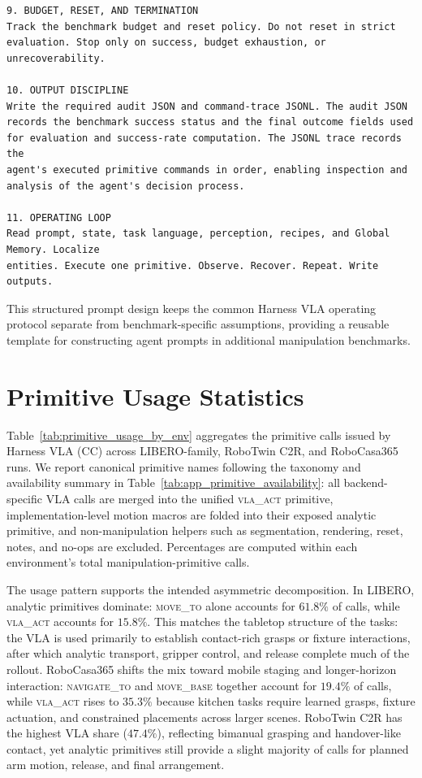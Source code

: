 \documentclass{article}
\begin{document}
\begin{samepage}
\begin{lstlisting}[frame=single,framerule=0.5pt]
9. BUDGET, RESET, AND TERMINATION
Track the benchmark budget and reset policy. Do not reset in strict
evaluation. Stop only on success, budget exhaustion, or unrecoverability.

10. OUTPUT DISCIPLINE
Write the required audit JSON and command-trace JSONL. The audit JSON
records the benchmark success status and the final outcome fields used
for evaluation and success-rate computation. The JSONL trace records the
agent's executed primitive commands in order, enabling inspection and
analysis of the agent's decision process.

11. OPERATING LOOP
Read prompt, state, task language, perception, recipes, and Global Memory. Localize
entities. Execute one primitive. Observe. Recover. Repeat. Write outputs.
\end{lstlisting}
\end{samepage}

This structured prompt design keeps the common Harness VLA operating protocol separate from benchmark-specific assumptions, providing a reusable template for constructing agent prompts in additional manipulation benchmarks.


\section{Primitive Usage Statistics}
\label{app:primitive_stats}

Table~\ref{tab:primitive_usage_by_env} aggregates the primitive calls issued by Harness VLA (CC) across LIBERO-family, RoboTwin C2R, and RoboCasa365 runs. We report canonical primitive names following the taxonomy and availability summary in Table~\ref{tab:app_primitive_availability}: all backend-specific VLA calls are merged into the unified \textsc{vla\_act} primitive, implementation-level motion macros are folded into their exposed analytic primitive, and non-manipulation helpers such as segmentation, rendering, reset, notes, and no-ops are excluded. Percentages are computed within each environment's total manipulation-primitive calls.

The usage pattern supports the intended asymmetric decomposition. In LIBERO, analytic primitives dominate: \textsc{move\_to} alone accounts for $61.8\%$ of calls, while \textsc{vla\_act} accounts for $15.8\%$. This matches the tabletop structure of the tasks: the VLA is used primarily to establish contact-rich grasps or fixture interactions, after which analytic transport, gripper control, and release complete much of the rollout. RoboCasa365 shifts the mix toward mobile staging and longer-horizon interaction: \textsc{navigate\_to} and \textsc{move\_base} together account for $19.4\%$ of calls, while \textsc{vla\_act} rises to $35.3\%$ because kitchen tasks require learned grasps, fixture actuation, and constrained placements across larger scenes. RoboTwin C2R has the highest VLA share ($47.4\%$), reflecting bimanual grasping and handover-like contact, yet analytic primitives still provide a slight majority of calls for planned arm motion, release, and final arrangement.
\end{document}
